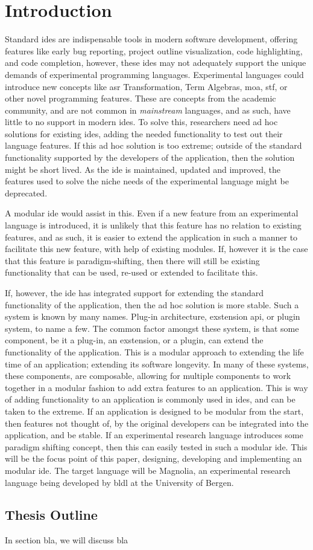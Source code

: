 \chapter{Introduction}


Standard \gls{ide}s are indispensable tools in modern software development,
offering features like early bug reporting, project outline visualization, code
highlighting, and code completion, however, these \gls{ide}s may not adequately
support the unique demands of experimental programming languages. Experimental
languages could introduce new concepts like \gls{asr} Transformation, Term
Algebras, \gls{moa}, \gls{stf}, or other novel programming features. These are
concepts from the academic community, and are not common in \textit{mainstream}
languages, and as such, have little to no support in modern \gls{ide}s. To solve
this, researchers need ad hoc solutions for existing \gls{ide}s, adding the
needed functionality to test out their language features. If this ad hoc
solution is too extreme; outside of the standard functionality supported by the
developers of the application, then the solution might be short lived. As the
\gls{ide} is maintained, updated and improved, the features used to solve the
niche needs of the experimental language might be deprecated.

A modular \gls{ide} would assist in this. Even if a new feature from an
experimental language is introduced, it is unlikely that this feature has no
relation to existing features, and as such, it is easier to extend the
application in such a manner to facilitate this new feature, with help of
existing modules.
If, however it is the case that this feature is paradigm-shifting, then there
will still be existing functionality that can be used, re-used or extended to
facilitate this.

If, however, the \gls{ide} has integrated support for extending the standard
functionality of the application, then the ad hoc solution is more stable. Such
a system is known by many names. Plug-in architecture, exstension \gls{api}, or
plugin system, to name a few. The common factor amongst these system, is that
some component, be it a plug-in, an exstension, or a plugin, can extend the
functionality of the application. This is a modular approach to extending the
life time of an application; extending its software longevity. In many of these
systems, these components, are composable, allowing for multiple components to
work together in a modular fashion to add extra features to an application. This
is way of adding functionality to an application is commonly used in \gls{ide}s,
and can be taken to the extreme. If an application is designed to be modular
from the start, then features not thought of, by the original developers can be
integrated into the application, and be stable. If an experimental research
language introduces some paradigm shifting concept, then this can easily tested
in such a modular \gls{ide}. This will be the focus point of this paper,
designing, developing and implementing an modular \gls{ide}. The target language
will be Magnolia, an experimental research language being developed by
\gls{bldl} at the University of Bergen.

\section{Thesis Outline}

In section bla, we will discuss bla
